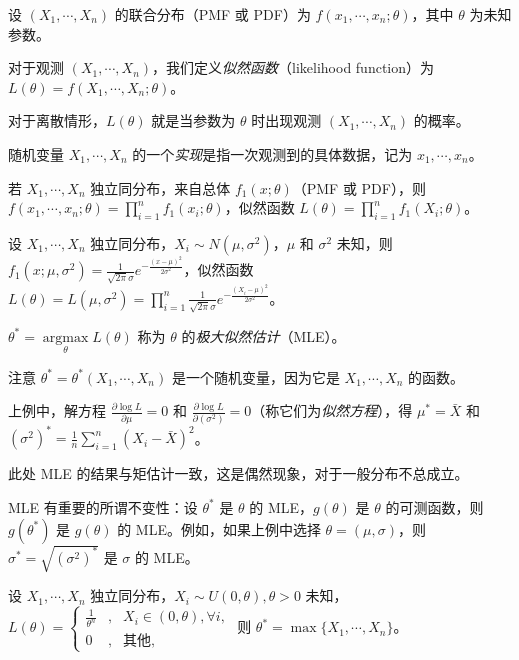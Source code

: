 \documentclass[../main.tex]{subfiles}
\begin{document}
设 $(X_1,\cdots,X_n)$ 的联合分布（PMF 或 PDF）为 $f(x_1,\cdots,x_n;\theta)$，其中 $\theta$ 为未知参数。

对于观测 $(X_1,\cdots,X_n)$，我们定义\emph{似然函数}（likelihood function）为 $L(\theta)=f(X_1,\cdots,X_n;\theta)$。

对于离散情形，$L(\theta)$ 就是当参数为 $\theta$ 时出现观测 $(X_1,\cdots,X_n)$ 的概率。

随机变量 $X_1,\cdots,X_n$ 的一个\emph{实现}是指一次观测到的具体数据，记为 $x_1,\cdots,x_n$。

若 $X_1,\cdots,X_n$ 独立同分布，来自总体 $f_1(x;\theta)$（PMF 或 PDF），则 $f(x_1,\cdots,x_n;\theta)=\prod_{i=1}^nf_1(x_i;\theta)$，似然函数 $L(\theta)=\prod_{i=1}^nf_1(X_i;\theta)$。

\begin{example}
    设 $X_1,\cdots,X_n$ 独立同分布，$X_i\sim N(\mu,\sigma^2)$，$\mu$ 和 $\sigma^2$ 未知，则 $f_1(x;\mu,\sigma^2)=\frac1{\sqrt{2\pi}\sigma}e^{-\frac{(x-\mu)^2}{2\sigma^2}}$，似然函数 $L(\theta)=L(\mu,\sigma^2)=\prod_{i=1}^n\frac1{\sqrt{2\pi}\sigma}e^{-\frac{(X_i-\mu)^2}{2\sigma^2}}$。
\end{example}


\begin{definition}\label{def:6.2.1}
    $\theta^*=\underset{\theta}{\operatorname{argmax}}L(\theta)$ 称为 $\theta$ 的\emph{极大似然估计}（MLE）。
\end{definition}

注意 $\theta^*=\theta^*(X_1,\cdots,X_n)$ 是一个随机变量，因为它是 $X_1,\cdots,X_n$ 的函数。

\begin{example}
    上例中，解方程 $\frac{\partial\log L}{\partial\mu}=0$ 和 $\frac{\partial\log L}{\partial(\sigma^2)}=0$（称它们为\emph{似然方程}），得 $\mu^*=\bar X$ 和 $(\sigma^2)^*=\frac1n\sum_{i=1}^n(X_i-\bar X)^2$。
\end{example}

此处 MLE 的结果与矩估计一致，这是偶然现象，对于一般分布不总成立。

\begin{proposition}
    MLE 有重要的所谓不变性：设 $\theta^*$ 是 $\theta$ 的 MLE，$g(\theta)$ 是 $\theta$ 的可测函数，则 $g(\theta^*)$ 是 $g(\theta)$ 的 MLE。例如，如果上例中选择 $\theta=(\mu,\sigma)$，则 $\sigma^*=\sqrt{(\sigma^2)^*}$ 是 $\sigma$ 的 MLE。
\end{proposition}

\begin{example}
    设 $X_1,\cdots,X_n$ 独立同分布，$X_i\sim U(0,\theta),\theta>0$ 未知，$L(\theta)=\left\{
        \begin{aligned}
            \frac1{\theta^n} & , & X_i\in (0,\theta),\forall i, \\
            0                & , & \text{其他},
        \end{aligned}\right.$ 则 $\theta^*=\max\{X_1,\cdots,X_n\}$。
\end{example}
\end{document}
